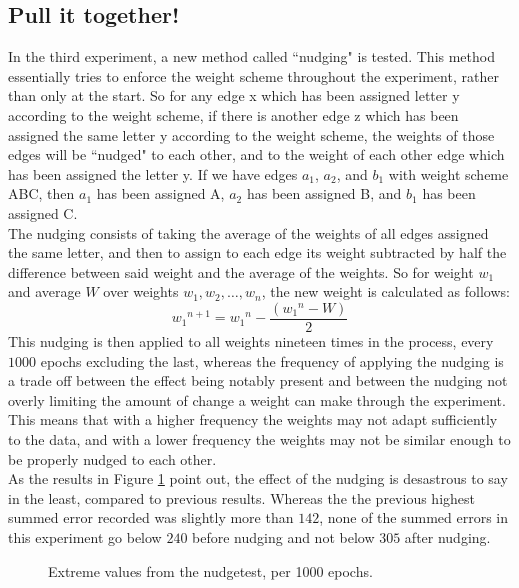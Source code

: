 \documentclass[a4paper, 10pt, notitlepage, twocolumn]{article}
\begin{document}
  \subsection{Pull it together!}
  In the third experiment, a new method called ``nudging" is tested. This method essentially tries to enforce the weight scheme throughout the experiment, rather than only at the start. So for any edge x which has been assigned letter y according to the weight scheme, if there is another edge z which has been assigned the same letter y according to the weight scheme, the weights of those edges will be ``nudged" to each other, and to the weight of each other edge which has been assigned the letter y. If we have edges $a_1$, $a_2$, and $b_1$ with weight scheme ABC, then $a_1$ has been assigned A, $a_2$ has been assigned B, and $b_1$ has been assigned C. \\
  The nudging consists of taking the average of the weights of all edges assigned the same letter, and then to assign to each edge its weight subtracted by half the difference between said weight and the average of the weights. So for weight $w_1$ and average $W$ over weights $w_1, w_2, \ldots, w_n$, the new weight is calculated as follows: 
  $${w_1}^{n + 1} = {w_1}^n - \frac{({w_1}^n - W)}{2}$$
  This nudging is then applied to all weights nineteen times in the process, every $1000$ epochs excluding the last, whereas the frequency of applying the nudging is a trade off between the effect being notably present and between the nudging not overly limiting the amount of change a weight can make through the experiment. This means that with a higher frequency the weights may not adapt sufficiently to the data, and with a lower frequency the weights may not be similar enough to be properly nudged to each other.\\
  As the results in Figure \ref{nudgegraph} point out, the effect of the nudging is desastrous to say in the least, compared to previous results. Whereas the the previous highest summed error recorded was slightly more than $142$, none of the summed errors in this experiment go below $240$ before nudging and not below $305$ after nudging. %

\begin{figure}[h]
  \centering
  	\caption{Extreme values from the nudgetest, per 1000 epochs.}
  	\label{nudgegraph}
\end{figure}
\end{document}
